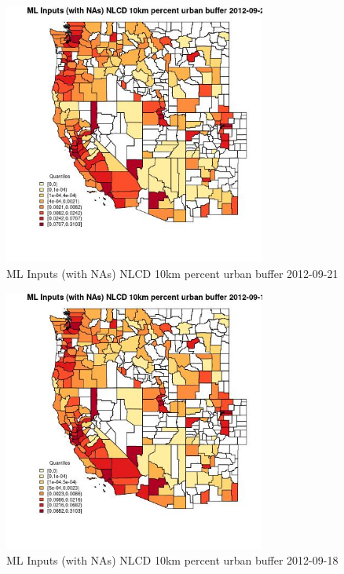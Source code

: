 \begin{figure} 
\centering  
\includegraphics[width=0.77\textwidth]{Code_Outputs/Report_ML_input_PM25_Step4_part_e_de_duplicated_aves_compiled_2019-05-14wNAs_CountyNLCD_10km_percent_urban_bufferMean2012-09-21_2012-09-21.jpg} 
\caption{\label{fig:Report_ML_input_PM25_Step4_part_e_de_duplicated_aves_compiled_2019-05-14wNAsCountyNLCD_10km_percent_urban_bufferMean2012-09-21_2012-09-21}ML Inputs (with NAs) NLCD 10km percent urban buffer 2012-09-21} 
\end{figure} 
 

\begin{figure} 
\centering  
\includegraphics[width=0.77\textwidth]{Code_Outputs/Report_ML_input_PM25_Step4_part_e_de_duplicated_aves_compiled_2019-05-14wNAs_CountyNLCD_10km_percent_urban_bufferMean2012-09-18_2012-09-18.jpg} 
\caption{\label{fig:Report_ML_input_PM25_Step4_part_e_de_duplicated_aves_compiled_2019-05-14wNAsCountyNLCD_10km_percent_urban_bufferMean2012-09-18_2012-09-18}ML Inputs (with NAs) NLCD 10km percent urban buffer 2012-09-18} 
\end{figure} 
 

